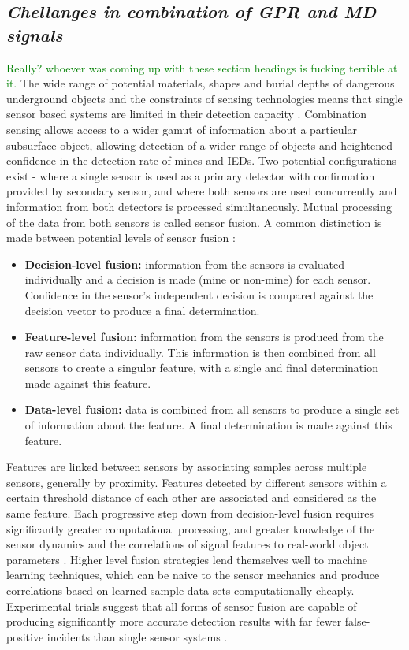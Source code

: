 \documentclass[main.tex]{subfiles}
\begin{document}
\subsection{\textit{Chellanges in combination of GPR and MD signals}}
\textcolor{green}{Really? whoever was coming up with these section headings is fucking terrible at it.}
The wide range of potential materials, shapes and burial depths of dangerous underground objects and the constraints of sensing technologies means that single sensor based systems are limited in their detection capacity \parencite{Yarovoy2009}. Combination sensing allows access to a wider gamut of information about a particular subsurface object, allowing detection of a wider range of objects and heightened confidence in the detection rate of mines and IEDs. Two potential configurations exist - where a single sensor is used as a primary detector with confirmation provided by secondary sensor, and where both sensors are used concurrently and information from both detectors is processed simultaneously. Mutual processing of the data from both sensors is called sensor fusion. A common distinction is made between potential levels of sensor fusion \parencite{Yarovoy2009}:
\begin{itemize}
\item \textbf{Decision-level fusion:} information from the sensors is evaluated individually and a decision is made (mine or non-mine) for each sensor. Confidence in the sensor's independent decision is compared against the decision vector to produce a final determination.
\item \textbf{Feature-level fusion:} information from the sensors is produced from the raw sensor data individually. This information is then combined from all sensors to create a singular feature, with a single and final determination made against this feature. 
\item \textbf{Data-level fusion:} data is combined from all sensors to produce a single set of information about the feature. A final determination is made against this feature.
\end{itemize}
Features are linked between sensors by associating samples across multiple sensors, generally by proximity. Features detected by different sensors within a certain threshold distance of each other are associated and considered as the same feature. Each progressive step down from decision-level fusion requires significantly greater computational processing, and greater knowledge of the sensor dynamics and the correlations of signal features to real-world object parameters \parencite{Yarovoy2009}. Higher level fusion strategies lend themselves well to machine learning techniques, which can be naive to the sensor mechanics and produce correlations based on learned sample data sets computationally cheaply. Experimental trials suggest that all forms of sensor fusion are capable of producing significantly more accurate detection results with far fewer false-positive incidents than single sensor systems \parencite{Yarovoy2009}.
\end{document}

